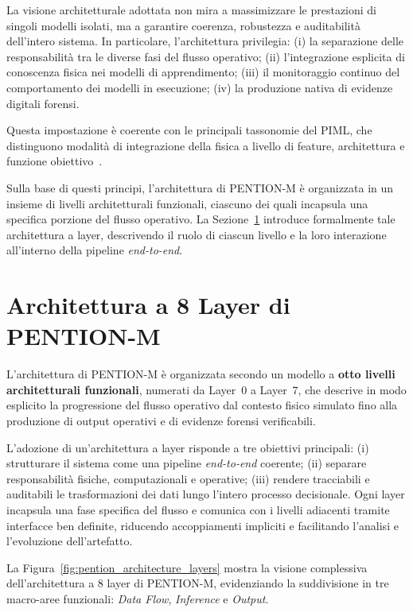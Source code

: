La visione architetturale adottata non mira a massimizzare le prestazioni di singoli modelli isolati, ma a garantire coerenza, robustezza e auditabilità dell’intero sistema.
In particolare, l’architettura privilegia:
(i) la separazione delle responsabilità tra le diverse fasi del flusso operativo;
(ii) l’integrazione esplicita di conoscenza fisica nei modelli di apprendimento;
(iii) il monitoraggio continuo del comportamento dei modelli in esecuzione;
(iv) la produzione nativa di evidenze digitali forensi.

Questa impostazione è coerente con le principali tassonomie del PIML, che distinguono modalità di integrazione della fisica a livello di feature, architettura e funzione obiettivo~\cite{meng2025piml}.

Sulla base di questi principi, l’architettura di \textsc{PENTION-M} è organizzata in un insieme di livelli architetturali funzionali, ciascuno dei quali incapsula una specifica porzione del flusso operativo.
La Sezione~\ref{sec:arch_layers} introduce formalmente tale architettura a layer, descrivendo il ruolo di ciascun livello e la loro interazione all’interno della pipeline \textit{end-to-end}.

\section{Architettura a 8 Layer di \textsc{PENTION-M}}
\label{sec:arch_layers}

L’architettura di \textsc{PENTION-M} è organizzata secondo un modello a \textbf{otto livelli architetturali funzionali}, numerati da Layer~0 a Layer~7, che descrive in modo esplicito la progressione del flusso operativo dal contesto fisico simulato fino alla produzione di output operativi e di evidenze forensi verificabili.

L’adozione di un’architettura a layer risponde a tre obiettivi principali:
(i) strutturare il sistema come una pipeline \textit{end-to-end} coerente;
(ii) separare responsabilità fisiche, computazionali e operative;
(iii) rendere tracciabili e auditabili le trasformazioni dei dati lungo l’intero processo decisionale.
Ogni layer incapsula una fase specifica del flusso e comunica con i livelli adiacenti tramite interfacce ben definite, riducendo accoppiamenti impliciti e facilitando l’analisi e l’evoluzione dell’artefatto.

La Figura~\ref{fig:pention_architecture_layers} mostra la visione complessiva dell’architettura a 8 layer di \textsc{PENTION-M}, evidenziando la suddivisione in tre macro-aree funzionali: \emph{Data Flow}, \emph{Inference} e \emph{Output}.

